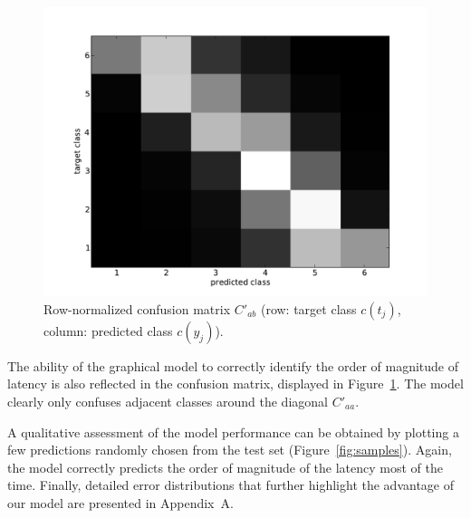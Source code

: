 \documentclass[10pt,a4paper,notitlepage,twocolumn]{article}
\begin{document}
\begin{figure}[h]
\centering
\includegraphics[width=0.8\columnwidth]{full_confusion}
\caption{Row-normalized confusion matrix $C'_{ab}$ (row: target class $c(t_j)$, column: predicted class $c(y_j)$).}
\label{fig:conf}
\end{figure}


The ability of the graphical model to correctly identify the order of magnitude of latency is also reflected in the confusion matrix, displayed in Figure~\ref{fig:conf}.
The model clearly only confuses adjacent classes around the diagonal $C'_{aa}$.

A qualitative assessment of the model performance can be obtained by plotting a few predictions randomly chosen from the test set (Figure~\ref{fig:samples}).
Again, the model correctly predicts the order of magnitude of the latency most of the time.
%
Finally, detailed error distributions that further highlight the advantage of our model are presented in Appendix~A.
\end{document}
